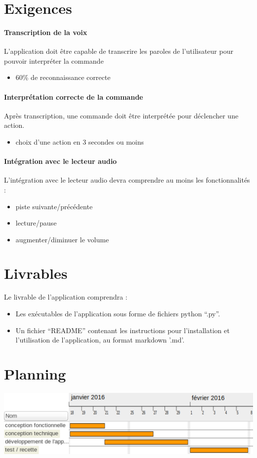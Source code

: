 \documentclass[12pt]{article}
\begin{document}
    \section{Exigences}

\paragraph{Transcription de la voix\\}
L'application doit être capable de transcrire
les paroles de l'utilisateur pour pouvoir interpréter la
commande
\begin{itemize}
    \item 60\% de reconnaissance correcte
\end{itemize}

\paragraph{Interprétation correcte de la commande\\}
Après transcription, une commande doit être interprétée pour déclencher une
action.
\begin{itemize}
    \item choix d'une action en 3 secondes ou moins
\end{itemize}

\paragraph{Intégration avec le lecteur audio\\}
L'intégration avec le lecteur audio devra comprendre au moins les
fonctionnalités :
\begin{itemize}
    \item piste suivante/précédente
    \item lecture/pause
    \item augmenter/diminuer le volume
\end{itemize}

    \section{Livrables}

    Le livrable de l'application comprendra :

    \begin{itemize}
        \item Les exécutables de l'application sous forme de fichiers python
            ``.py''.
        \item Un fichier ``README'' contenant les instructions pour
            l'installation et l'utilisation de l'application, au format
            markdown '.md'.
    \end{itemize}

    \section{Planning}

    \includegraphics[width=15cm]{images/gantt.png}
\end{document}
